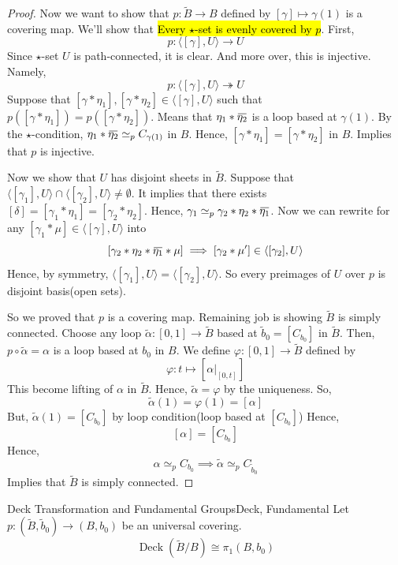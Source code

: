 \documentclass[12pt, a4paper, twoside]{article}
\newcommand{\overbar}[1]{\mkern 1.5mu\overline{\mkern-1.5mu#1\mkern-1.5mu}\mkern 1.5mu}
\theoremstyle{plain}
\begin{document}
\begin{proof}
    Now we want to show that $p: \tilde{B} \rightarrow B$ defined by $[\gamma] \mapsto \gamma(1)$ is a covering map. 
    We'll show that \hl{Every $\star$-set is evenly covered by $p$}. 
    First, 
    \[p: \langle [\gamma], U \rangle \rightarrow U\]
    Since $\star$-set $U$ is path-connected, it is clear. 
    And more over, this is injective. Namely,
    \[p: \langle [\gamma], U \rangle \twoheadrightarrow U\]
    Suppose that $[\gamma * \eta_1], [\gamma * \eta_2] \in \langle [\gamma], U \rangle$ such that $p([\gamma * \eta_1]) = p([\gamma * \eta_2])$. 
    Means that 
    $\eta_1 * \overbar{\eta_2}$ is a loop based at $\gamma(1)$. 
    By the $\star$-condition, $\eta_1 * \overbar{\eta_2} \simeq_p C_{\gamma(1)}$ in $B$. 
    Hence, $[\gamma * \eta_1] = [\gamma * \eta_2]$ in $B$. Implies that $p$ is injective. 

    Now we show that $U$ has disjoint sheets in $\tilde{B}$. Suppose that 
    $\langle [\gamma_1], U \rangle \cap \langle [\gamma_2], U \rangle \neq \emptyset$. 
    It implies that there exists $[\delta] = [\gamma_1 * \eta_1] = [\gamma_2 * \eta_2]$. 
    Hence, $\gamma_1 \simeq_p \gamma_2 * \eta_2 * \overbar{\eta_1}$. Now we can rewrite 
    for any $[\gamma_1 * \mu] \in \langle [\gamma], U \rangle$ into 
    \[[\gamma_2 * \eta_2 * \overbar{\eta_1} * \mu] \implies [\gamma_2 * \mu'] \in \langle [\gamma_2], U \rangle\]
    Hence, by symmetry, $\langle [\gamma_1], U \rangle = \langle [\gamma_2], U \rangle$. 
    So every preimages of $U$ over $p$ is disjoint basis(open sets). 

    So we proved that $p$ is a covering map. Remaining job is showing $\tilde{B}$ is simply connected. 
    Choose any loop $\tilde{\alpha}: [0,1] \rightarrow \tilde{B}$ based at $\tilde{b}_0 = [C_{b_0}]$ in $\tilde{B}$. 
    Then, $p \circ \tilde{\alpha} = \alpha$ is a loop based at $b_0$ in $B$. 
    We define $\varphi: [0,1] \rightarrow \tilde{B}$ defined by 
    \[\varphi: t \mapsto [\alpha|_{[0, t]}]\]
    This become lifting of $\alpha$ in $\tilde{B}$. 
    Hence, $\tilde{\alpha} = \varphi$ by the uniqueness. 
    So, 
    \[\tilde{\alpha}(1) = \varphi(1) = [\alpha]\]
    But, $\tilde{\alpha}(1) = [C_{b_0}]$ by loop condition(loop based at $[C_{b_0}]$) Hence, 
    \[[\alpha] = [C_{b_0}]\]
    Hence, 
    \[\alpha \simeq_p C_{b_0} \implies \tilde{\alpha} \simeq_p C_{\tilde{b}_0}\]
    Implies that $\tilde{B}$ is simply connected. 
\end{proof}

\newpage 

\begin{thm}{Deck Transformation and Fundamental Groups}{Deck, Fundamental}
    Let $p: (\tilde{B}, \tilde{b}_0) \rightarrow (B, b_0)$ be an universal covering. 
    \[\operatorname{Deck}(\tilde{B}/B) \cong \pi_1(B, b_0)\]
\end{thm}
\end{document}

